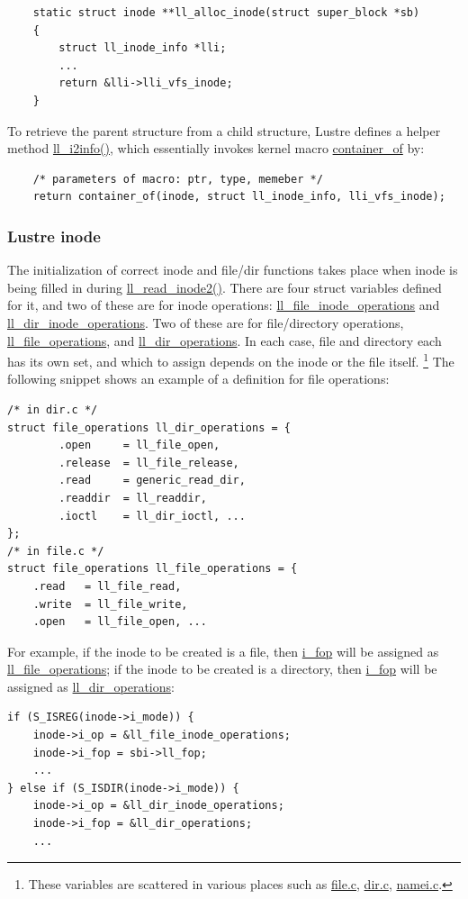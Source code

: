 \begin{Verbatim}
    static struct inode **ll_alloc_inode(struct super_block *sb)
    {
        struct ll_inode_info *lli;
        ...
        return &lli->lli_vfs_inode;
    }
\end{Verbatim}


To retrieve the parent structure from a child structure, Lustre defines a
helper method \url{ll_i2info()}, which essentially invokes kernel macro
\url{container_of} by:

\begin{Verbatim}
    /* parameters of macro: ptr, type, memeber */
    return container_of(inode, struct ll_inode_info, lli_vfs_inode);
\end{Verbatim}

\subsubsection{Lustre inode}

The initialization of correct inode and file/dir functions takes
place when inode is being filled in during \url{ll_read_inode2()}.  There are
four struct variables defined for it, and two of these are for inode
operations: \url{ll_file_inode_operations} and \url{ll_dir_inode_operations}.
Two of these are for file/directory operations, \url{ll_file_operations}, and
\url{ll_dir_operations}. In each case, file and directory each has its own
set, and which to assign depends on the inode or the file itself.
\footnote{These variables are scattered in various places such as
\url{file.c}, \url{dir.c}, \url{namei.c}.} The following snippet shows an 
example of a definition for file operations:

\begin{Verbatim}
/* in dir.c */
struct file_operations ll_dir_operations = {
        .open     = ll_file_open,
        .release  = ll_file_release,
        .read     = generic_read_dir,
        .readdir  = ll_readdir,
        .ioctl    = ll_dir_ioctl, ...
};
/* in file.c */
struct file_operations ll_file_operations = {
	.read	= ll_file_read,
	.write	= ll_file_write,
	.open	= ll_file_open, ... 
\end{Verbatim}

For example, if the inode to be created is a file, then \url{i_fop} will be
assigned as \url{ll_file_operations}; if the inode to be created is a
directory, then \url{i_fop} will be assigned as \url{ll_dir_operations}:

\begin{Verbatim}
if (S_ISREG(inode->i_mode)) {
    inode->i_op = &ll_file_inode_operations;
    inode->i_fop = sbi->ll_fop;
    ...
} else if (S_ISDIR(inode->i_mode)) {
    inode->i_op = &ll_dir_inode_operations;
    inode->i_fop = &ll_dir_operations;
    ...
\end{Verbatim}

